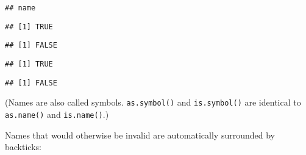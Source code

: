 \begin{verbatim}
## name
\end{verbatim}

\begin{Shaded}
\begin{Highlighting}[]
\NormalTok{(}\NormalTok{(}\NormalTok{))}
\end{Highlighting}
\end{Shaded}

\begin{verbatim}
## [1] TRUE
\end{verbatim}

\begin{Shaded}
\begin{Highlighting}[]
\NormalTok{(}\NormalTok{)}
\end{Highlighting}
\end{Shaded}

\begin{verbatim}
## [1] FALSE
\end{verbatim}

\begin{Shaded}
\begin{Highlighting}[]
\NormalTok{(}
\end{Highlighting}
\end{Shaded}

\begin{verbatim}
## [1] TRUE
\end{verbatim}

\begin{Shaded}
\begin{Highlighting}[]
\NormalTok{(}\NormalTok{(}
\end{Highlighting}
\end{Shaded}

\begin{verbatim}
## [1] FALSE
\end{verbatim}

(Names are also called symbols. \texttt{as.symbol()} and
\texttt{is.symbol()} are identical to \texttt{as.name()} and
\texttt{is.name()}.)

Names that would otherwise be invalid are automatically surrounded by
backticks: 

